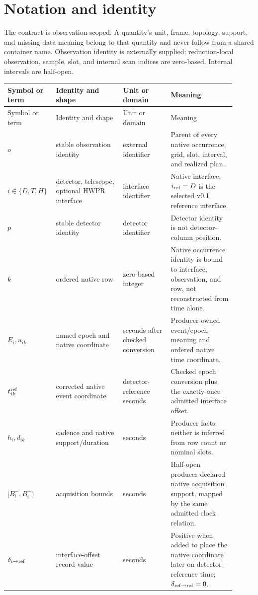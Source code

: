 \section{Notation and identity}
\label{sec:notation}

The contract is observation-scoped.  A quantity's unit, frame, topology,
support, and missing-data meaning belong to that quantity and never follow
from a shared container name.  Observation identity is externally supplied;
reduction-local observation, sample, slot, and internal scan indices are
zero-based.  Internal intervals are half-open.

\begin{longtable}{L{0.16\linewidth}L{0.28\linewidth}L{0.20\linewidth}L{0.27\linewidth}}
\toprule
Symbol or term & Identity and shape & Unit or domain & Meaning\\
\midrule
\endfirsthead
\toprule
Symbol or term & Identity and shape & Unit or domain & Meaning\\
\midrule
\endhead
\(o\) & stable observation identity & external identifier & Parent of every native occurrence, grid, slot, interval, and realized plan.\\
\(i\in\{D,T,H\}\) & detector, telescope, optional HWPR interface & interface identifier & Native interface; \(i_{\rm ref}=D\) is the selected v0.1 reference interface.\\
\(p\) & stable detector identity & detector identifier & Detector identity is not detector-column position.\\
\(k\) & ordered native row & zero-based integer & Native occurrence identity is bound to interface, observation, and row, not reconstructed from time alone.\\
\(E_i,u_{ik}\) & named epoch and native coordinate & seconds after checked conversion & Producer-owned event/epoch meaning and ordered native time coordinate.\\
\(t_{ik}^{\rm ref}\) & corrected native event coordinate & detector-reference seconds & Checked epoch conversion plus the exactly-once admitted interface offset.\\
\(h_i,d_{ik}\) & cadence and native support/duration & seconds & Producer facts; neither is inferred from row count or nominal slots.\\
\([B_i^-,B_i^+)\) & acquisition bounds & seconds & Half-open producer-declared native acquisition support, mapped by the same admitted clock relation.\\
\(\delta_{i\rightarrow\rm ref}\) & interface-offset record value & seconds & Positive when added to place the native coordinate later on detector-reference time; \(\delta_{{\rm ref}\rightarrow{\rm ref}}=0\).\\

\end{longtable}
